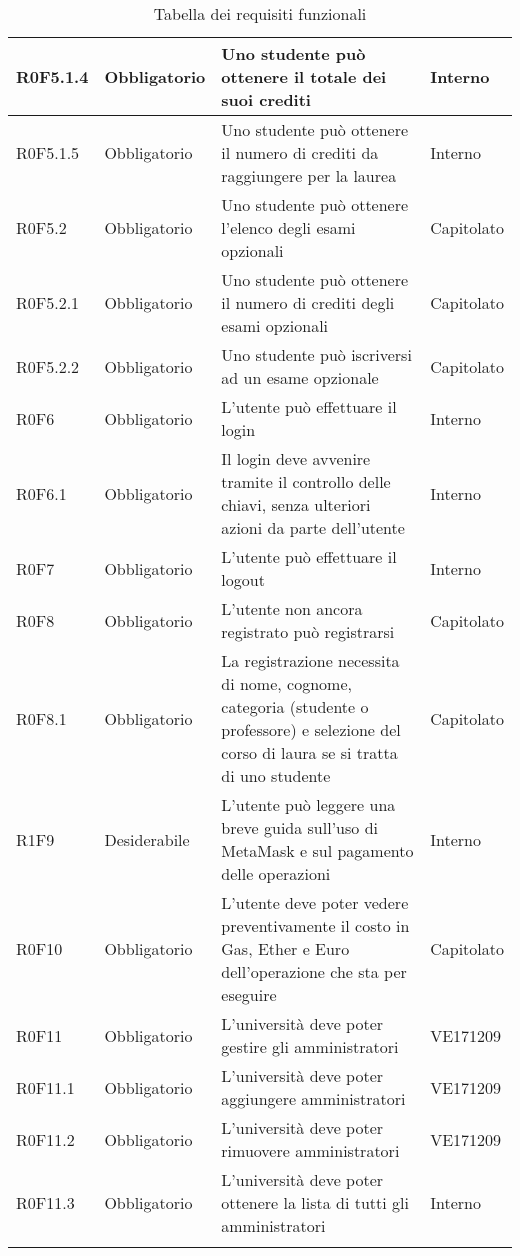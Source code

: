 \documentclass[AnalisiDeiRequisiti.tex]{subfiles}
\begin{document}
\begin{longtable}[H]{|p{2.5cm}|p{2.5cm}|p{5cm}|p{2cm}|}
	R0F5.1.4 & Obbligatorio & Uno studente può ottenere il totale dei suoi crediti & Interno \\ \hline
	R0F5.1.5 & Obbligatorio & Uno studente può ottenere il numero di crediti da raggiungere per la laurea & Interno \\ \hline
	R0F5.2 & Obbligatorio & Uno studente può ottenere l'elenco degli esami opzionali & Capitolato \\ \hline
	R0F5.2.1 & Obbligatorio & Uno studente può ottenere il numero di crediti degli esami opzionali & Capitolato \\ \hline
	R0F5.2.2 & Obbligatorio & Uno studente può iscriversi ad un esame opzionale & Capitolato \\ \hline
	R0F6 & Obbligatorio & L'utente può effettuare il login & Interno \\ \hline
	R0F6.1 & Obbligatorio & Il login deve avvenire tramite il controllo delle chiavi, senza ulteriori azioni da parte dell'utente & Interno \\ \hline
	R0F7 & Obbligatorio & L'utente può effettuare il logout & Interno \\ \hline	R0F8 & Obbligatorio & L'utente non ancora registrato può registrarsi & Capitolato \\ \hline
	R0F8.1 & Obbligatorio & La registrazione necessita di nome, cognome, categoria (studente o professore) e selezione del corso di laura se si tratta di uno studente & Capitolato \\ \hline
	R1F9 & Desiderabile & L'utente può leggere una breve guida sull'uso di MetaMask e sul pagamento delle operazioni & Interno \\ \hline	
	R0F10 & Obbligatorio & L'utente deve poter vedere preventivamente il costo in Gas, Ether e Euro dell'operazione che sta per eseguire & Capitolato \\ \hline	
	R0F11 & Obbligatorio & L'università deve poter gestire gli amministratori & VE171209 \\ \hline %
	R0F11.1 & Obbligatorio & L'università deve poter aggiungere amministratori & VE171209 \\ \hline %
	R0F11.2 & Obbligatorio & L'università deve poter rimuovere amministratori & VE171209 \\ \hline %
	R0F11.3 & Obbligatorio & L'università deve poter ottenere la lista di tutti gli amministratori & Interno \\ \hline 
	\caption{Tabella dei requisiti funzionali}
\end{longtable}
\end{document}
